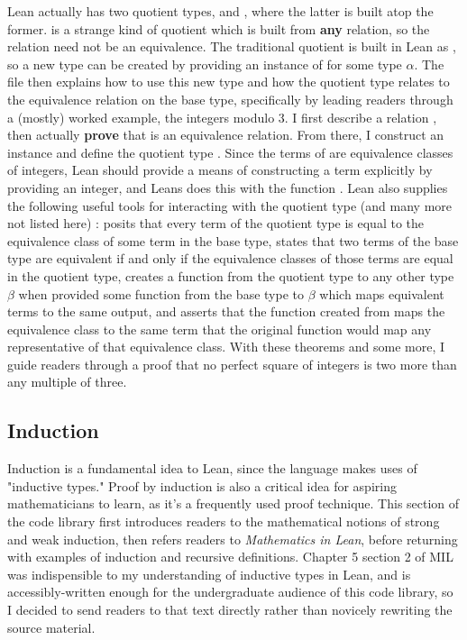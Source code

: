 Lean actually has two quotient types,  and , where the
latter is built atop the former.  is a strange kind of quotient which
is built from \textbf{any} relation, so the relation need not be an equivalence.
The traditional quotient is built in Lean as 
, so a new  type can 
be created by providing an instance of  for some type 
$\alpha$. The file then explains how to use this new type and how the quotient
type relates to the equivalence relation on the base type, specifically by
leading readers through a (mostly) worked example, the integers modulo 3.
I first describe a relation 
, then
actually \textbf{prove} that  is an equivalence relation. From there,
I construct an instance  and define the quotient
type . Since the terms of  are 
equivalence classes of integers, Lean should provide a means of constructing
a term explicitly by providing an integer, and Leans does this with the function
. Lean also 
supplies the following useful tools for interacting with the quotient
type (and many more not listed here) :
 posits that every term of the quotient type is
equal to the equivalence class of some term in the base type, 
 states that two terms of the base type are equivalent if
and only if the equivalence classes of those terms are equal in the quotient type,
 creates a function from the quotient type to any other type 
$\beta$ when provided some function from the base type to $\beta$ which
maps equivalent terms to the same output, and 
 asserts that the function created from 
maps the equivalence class to the same term that the original function would
map any representative of that equivalence class. With these theorems and some more, 
I guide readers through a proof that no perfect square of integers is two more than
any multiple of three.

\subsection{Induction}

Induction is a fundamental idea to Lean, since the language makes uses of
"inductive types." Proof by induction is also a critical idea for aspiring 
mathematicians to learn, as it's a frequently used proof technique. This
section of the code library first introduces readers to the mathematical notions
of strong and weak induction, then refers readers to \textit{Mathematics in Lean},
before returning with examples of induction and recursive definitions. Chapter 
5 section 2 of MIL was indispensible to my understanding of inductive types in 
Lean, and is accessibly-written enough for the undergraduate audience of this
code library, so I decided to send readers to that text directly rather than 
novicely rewriting the source material. 



